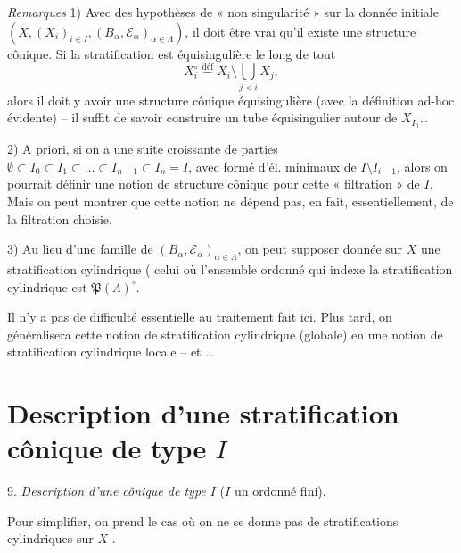 \documentclass[11pt,a4paper]{article}
\begin{document}

\struck{\ill{}} \emph{Remarques} 1) Avec des hypothèses de « non singularité » sur la donnée initiale $(X,(X_i)_{i\in I},(B_\alpha,\mathcal E_\alpha)_{\alpha\in\Lambda})$, il doit être vrai qu'il existe une structure cônique. Si la stratification \struck{\ill{}} est équisingulière le long de tout
\[
X_i^{\circ}\overset{\text{déf}}{=}X_i\setminus\bigcup_{j<i}X_j ,
\]
alors il doit y avoir une structure cônique équisingulière (avec la définition ad-hoc évidente) -- il suffit de savoir construire un tube équisingulier autour de $X_{I_0}$\ldots{}

2) A priori, si on a une suite  croissante de parties $\emptyset\subset I_0\subset I_1\subset\ldots\subset I_{n-1}\subset I_n=I$, avec   formé d'él. minimaux de $I\setminus I_{i-1}$, alors on pourrait définir  une notion de structure cônique pour cette « filtration » de $I$. Mais on peut montrer que cette notion ne dépend pas, en fait, essentiellement, de la filtration choisie.

3) Au lieu d'une famille de $(B_\alpha,\mathcal E_\alpha)_{\alpha\in\Lambda}$, on peut supposer donnée sur $X$ une stratification cylindrique  (\ill{} \ill{} \ill{} \ill{} celui où l'ensemble ordonné qui indexe la stratification cylindrique est $\mathfrak P(\Lambda)^{\circ}$.


Il n'y a pas de difficulté essentielle au traitement fait ici. Plus tard, on généralisera cette notion de stratification cylindrique (globale) en une notion de stratification cylindrique locale -- et \ill{} \ill{} \ill{}\ldots

\section*{Description d'une stratification cônique de type $I$}

9. \emph{Description d'une   cônique de type $I$} ($I$ un ordonné fini).

Pour simplifier, on prend  le cas où on ne se donne pas de stratifications cylindriques sur $X$ .

\struck{\ill{}}
\end{document}
